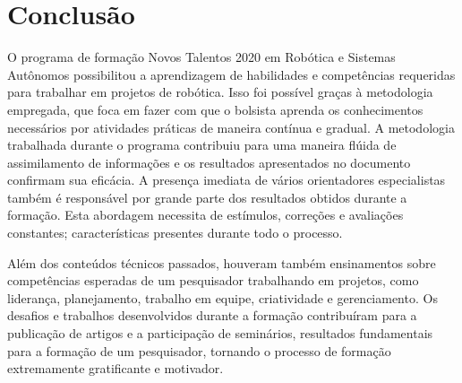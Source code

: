 \chapter{Conclusão}
\label{chap:conc}

O programa de formação Novos Talentos 2020 em Robótica e Sistemas Autônomos possibilitou a aprendizagem de habilidades e competências requeridas para trabalhar em projetos de robótica. Isso foi possível graças à metodologia empregada, que foca em fazer com que o bolsista aprenda os conhecimentos necessários por atividades práticas de maneira contínua e gradual. A metodologia trabalhada durante o programa contribuiu para uma maneira flúida de assimilamento de informações e os resultados apresentados no documento confirmam sua eficácia. A presença imediata de vários orientadores especialistas também é responsável por grande parte dos resultados obtidos durante a formação. Esta abordagem necessita de estímulos, correções e avaliações constantes; características presentes durante todo o processo.

Além dos conteúdos técnicos passados, houveram também ensinamentos sobre competências esperadas de um pesquisador trabalhando em projetos, como liderança, planejamento, trabalho em equipe, criatividade e gerenciamento. Os desafios e trabalhos desenvolvidos durante a formação contribuíram para a publicação de artigos e a participação de seminários, resultados fundamentais para a formação de um pesquisador, tornando o processo de formação extremamente gratificante e motivador.